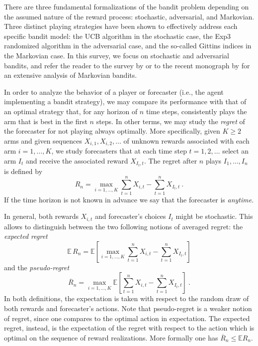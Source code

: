 \documentclass[11pt]{hackednow}
\newcommand{\E}{\mathbb{E}}
\newcommand{\oR}{\overline{R}}
\begin{document}
There are three fundamental formalizations of the bandit problem depending on the assumed nature of the reward process: stochastic, adversarial, and Markovian. Three distinct playing strategies have been shown to effectively address each specific bandit model: the UCB algorithm in the stochastic case, the Exp3 randomized algorithm in the adversarial case, and the so-called Gittins indices in the Markovian case. In this survey, we focus on stochastic and adversarial bandits, and refer the reader to the survey by \cite{mahajan2008multi} or to the recent monograph by \cite{GGW11} for an extensive analysis of Markovian bandits.

In order to analyze the behavior of a player or forecaster (i.e., the agent implementing a bandit strategy), we may compare its performance with that of an optimal strategy that, for any horizon of $n$ time steps, consistently plays the arm that is best in the first $n$ steps. In other terms, we may study the \textsl{regret} of the forecaster for not playing always optimally. More specifically, given $K \ge 2$ arms and given sequences $X_{i,1},X_{i,2},\dots$ of unknown rewards associated with each arm $i=1,\dots,K$, we study forecasters that at each time step $t=1,2,\dots$ select an arm $I_t$ and receive the associated reward $X_{I_t,t}$. The regret after $n$ plays $I_1,\dots,I_n$ is defined by
\begin{equation} \label{eq:regret}
    R_n = \max_{i=1,\hdots,K} \sum_{t=1}^n X_{i,t} - \sum_{t=1}^n X_{I_t,t}~.
\end{equation}
If the time horizon is not known in advance we say that the forecaster is {\em anytime}.

In general, both rewards $X_{i,t}$ and forecaster's choices $I_t$ might be stochastic. This allows to distinguish between the two following notions of averaged regret: the \textsl{expected regret}
\begin{equation} \label{eq:exp-regret}
    \E\,R_n = \E\left[\max_{i=1,\hdots,K} \sum_{t=1}^n X_{i,t} - \sum_{t=1}^n X_{I_t,t}\right]
\end{equation}
and the \textsl{pseudo-regret}
\begin{equation} \label{eq:pseudoregret}
\overline{R}_n = \max_{i=1,\dots,K} \E\left[ \sum_{t=1}^n X_{i,t} - \sum_{t=1}^n X_{I_t,t}\right]~.
\end{equation}
In both definitions, the expectation is taken with respect to the random draw of both rewards and forecaster's actions. Note that pseudo-regret is a weaker notion of regret, since one compares to the optimal action in expectation. The expected regret, instead, is the expectation of the regret with respect to the action which is optimal on the sequence of reward realizations. More formally one has $\oR_n \leq \E R_n$. 
\end{document}
